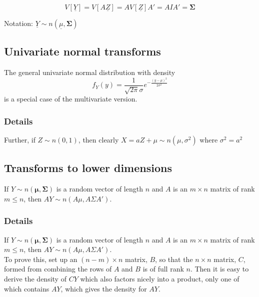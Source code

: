 \documentclass[12pt,a4paper]{article}
\theoremstyle{regla}
\theoremstyle{remark}
\theoremstyle{definition}
\theoremstyle{nonumberbreak}
\begin{document}
$$V[\underline{Y}] = V[A\underline{Z}] = AV[\underline{Z}]A' = AIA' = \boldsymbol{\Sigma}$$

Notation: $\underline{Y}\sim n(\underline{\mu}, \boldsymbol{\Sigma})$

\subsection{Univariate normal transforms}
\begin{fbox}
\begin{minipage}{0.97\textwidth}
The general univariate normal distribution with density 
$$
f_Y(y) = \frac{1}{\sqrt{2\pi}\sigma}e^{-\frac{(y-\mu)^2}{2\sigma^2}}
$$
is a special case of the multivariate version.
\end{minipage}
\end{fbox}
\subsubsection{Details}
Further, if $Z\sim n(0,1)$, then clearly $X=aZ+\mu \sim n(\mu,\sigma^2)$ where $\sigma^2=a^2$

\subsection{Transforms to lower dimensions}
\begin{fbox}
\begin{minipage}{0.97\textwidth}
If $Y\sim n \left ( \boldsymbol{\mu},\boldsymbol{\Sigma} \right )$ is a random vector of length $n$ and $A$ is an $m\times n$ matrix of rank $m\leq n$, then $AY \sim n(A\mu,A\Sigma A')$. 
\end{minipage}
\end{fbox}
\subsubsection{Details}
If $Y\sim n \left ( \boldsymbol{\mu},\boldsymbol{\Sigma} \right )$ is a random vector of length $n$ and $A$ is an $m\times n$ matrix of rank $m\leq n$, then $AY \sim n(A\mu,A\Sigma A')$. \\

To prove this, set up an $(n-m)\times n$ matrix, $B$, so that the $n\times n$ matrix, $C$, formed from combining the rows of $A$ and $B$ is of full rank $n$. Then it is easy to derive the density of $CY$ which also factors nicely into a product, only one of which contains $AY$, which gives the density for $AY$.
\end{document}
